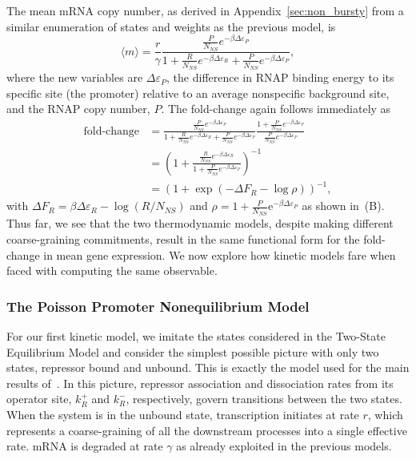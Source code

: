 The mean mRNA copy number, as derived in Appendix~\ref{sec:non_bursty}
from a similar enumeration of states and weights as the previous model, is
\begin{equation}
\langle m \rangle = \frac{r}{\gamma}
\frac{\frac{P}{N_{NS}} e^{-\beta\Delta\varepsilon_P}}
        {
        1 + \frac{R}{N_{NS}} e^{-\beta\Delta\varepsilon_R}
        + \frac{P}{N_{NS}} e^{-\beta\Delta\varepsilon_P}
        },
\end{equation}
where the new variables are $\Delta\varepsilon_P$, the difference in RNAP
binding energy to its specific site (the promoter) relative to an average
nonspecific background site, and the RNAP copy number, $P$. The fold-change
again follows immediately as
\begin{align}
\text{fold-change}
&= \frac{\frac{P}{N_{NS}} e^{-\beta\Delta\varepsilon_P}}
        {
        1 + \frac{R}{N_{NS}} e^{-\beta\Delta\varepsilon_R}
        + \frac{P}{N_{NS}} e^{-\beta\Delta\varepsilon_P}
        }
\frac{1 + \frac{P}{N_{NS}} e^{-\beta\Delta\varepsilon_P}}
        {\frac{P}{N_{NS}} e^{-\beta\Delta\varepsilon_P}}
\\
&= \left(
1 + \frac{\frac{R}{N_{NS}} e^{-\beta\Delta\varepsilon_R}}
        {1 + \frac{P}{N_{NS}} e^{-\beta\Delta\varepsilon_P}}
\right)^{-1}
\\
&= (1 + \exp(-\Delta F_R - \log\rho))^{-1},
\end{align}
with $\Delta F_R = \beta\Delta\varepsilon_R - \log(R/N_{NS})$ and $\rho = 1 +
\frac{P}{N_{NS}}\mathrm{e}^{-\beta\Delta\varepsilon_P}$ as shown
in~(B). Thus far, we see that the two thermodynamic
models, despite making different coarse-graining commitments, result in the same
functional form for the fold-change in mean gene expression.  We now explore how
kinetic models fare when faced with computing the same observable.

\subsubsection{The Poisson Promoter Nonequilibrium Model}
For our first kinetic model, we  imitate the states considered in the Two-State
Equilibrium Model and consider the simplest possible picture with only two
states, repressor bound and unbound. This is exactly the model used for the main
results of~\cite{Jones2014}. In this picture, repressor association and
dissociation rates from its operator site, $k_R^+$ and $k_R^-$, respectively,
govern transitions between the two states. When the system is in the unbound
state, transcription initiates at rate $r$, which represents a coarse-graining
of all the downstream processes into a single effective rate. mRNA is degraded
at rate $\gamma$ as already exploited in the previous models.

